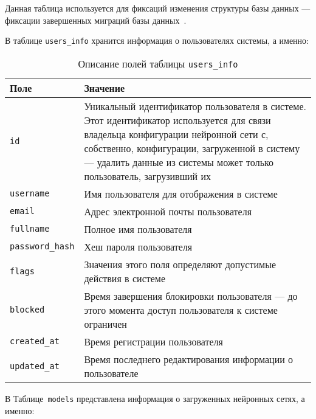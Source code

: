 Данная таблица используется для фиксаций изменения структуры базы данных --- фиксации завершенных миграций базы данных~\cite{database-migrations}.

В таблице \texttt{users\_info} хранится информация о пользователях системы, а именно:

\begin{table}[!ht]
    \caption{Описание полей таблицы \texttt{users\_info}}
    \label{tbl:users}
    \begin{center}
        \begin{tabular}{|p{}|p{}|}
            \hline
            \textbf{Поле} & \textbf{Значение} \\\hline
            \texttt{id} & Уникальный идентификатор пользователя в системе. Этот идентификатор используется для связи владельца конфигурации нейронной сети с, собственно, конфигурации, загруженной в систему --- удалить данные из системы может только пользователь, загрузивший их \\\hline
            \texttt{username} & Имя пользователя для отображения в системе\\\hline
            \texttt{email} & Адрес электронной почты пользователя\\\hline
            \texttt{fullname} & Полное имя пользователя \\\hline
            \texttt{password\_hash} & Хеш пароля пользователя \\\hline
            \texttt{flags} & Значения этого поля определяют допустимые действия в системе\\\hline
            \texttt{blocked} & Время завершения блокировки пользователя --- до этого момента доступ пользователя к системе ограничен \\\hline
            \texttt{created\_at} & Время регистрации пользователя\\\hline
            \texttt{updated\_at} & Время последнего редактирования информации о пользователе \\\hline
        \end{tabular}
    \end{center}
\end{table}

В Таблице~\texttt{models} представлена информация о загруженных нейронных сетях, а именно:


